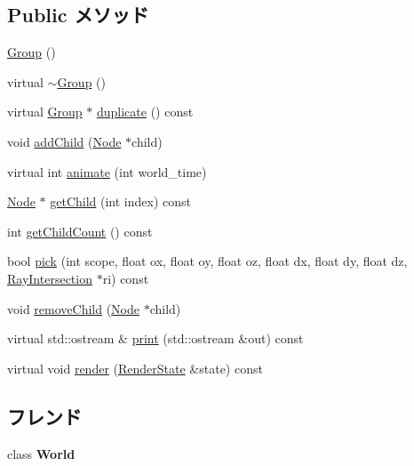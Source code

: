 \subsection*{Public メソッド}
\begin{CompactItemize}
\item 
\hyperlink{classm3g_1_1Group_0b29b9393b4b6856ac75b759f4166c13}{Group} ()
\item 
virtual \hyperlink{classm3g_1_1Group_a2a755272411c0d861f46f30970f5ca5}{$\sim$Group} ()
\item 
virtual \hyperlink{classm3g_1_1Group}{Group} $\ast$ \hyperlink{classm3g_1_1Group_1212dbd493e73180a6204874bd97df6b}{duplicate} () const 
\item 
void \hyperlink{classm3g_1_1Group_f7c798f6f7924dc14403df261f82153a}{addChild} (\hyperlink{classm3g_1_1Node}{Node} $\ast$child)
\item 
virtual int \hyperlink{classm3g_1_1Group_8aad1ceab4c2a03609c8a42324ce484d}{animate} (int world\_\-time)
\item 
\hyperlink{classm3g_1_1Node}{Node} $\ast$ \hyperlink{classm3g_1_1Group_a3af7d07fde341ef751157d274538698}{getChild} (int index) const 
\item 
int \hyperlink{classm3g_1_1Group_756d01dca16e146d69bb1881aca8fbb7}{getChildCount} () const 
\item 
bool \hyperlink{classm3g_1_1Group_10a3c77fa36fdb5d09b2bf39fe2a7c0b}{pick} (int scope, float ox, float oy, float oz, float dx, float dy, float dz, \hyperlink{classm3g_1_1RayIntersection}{RayIntersection} $\ast$ri) const 
\item 
void \hyperlink{classm3g_1_1Group_7415646c6f397f080d198176df44395c}{removeChild} (\hyperlink{classm3g_1_1Node}{Node} $\ast$child)
\item 
virtual std::ostream \& \hyperlink{classm3g_1_1Group_6fea17fa1532df3794f8cb39cb4f911f}{print} (std::ostream \&out) const 
\item 
virtual void \hyperlink{classm3g_1_1Group_8babc8a79b78615da51161e94029eea9}{render} (\hyperlink{structm3g_1_1RenderState}{RenderState} \&state) const 
\end{CompactItemize}
\subsection*{フレンド}
\begin{CompactItemize}
\item 
\hypertarget{classm3g_1_1Group_7b4bcdf992c21ae83363f25df05b1d25}{
class \textbf{World}}
\label{classm3g_1_1Group_7b4bcdf992c21ae83363f25df05b1d25}

\end{CompactItemize}


